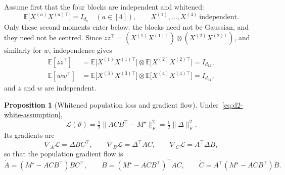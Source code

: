 \documentclass[11pt]{article}
\newcommand{\E}{\mathbb{E}}
\newcommand{\norm}[1]{\lVert #1\rVert}
\theoremstyle{definition}
\newtheorem{proposition}[theorem]{Proposition}
\numberwithin{equation}{section}
\begin{document}
Assume first that the four blocks are independent and whitened:
\begin{equation}\label{eq:d2-white-assumption}
\E\big[X^{(a)}X^{(a)\top}\big]=I_{d_a}\quad(a\in[4]),\qquad X^{(1)},\dots,X^{(4)}\ \text{independent}.
\end{equation}
Only these second moments enter below: the blocks need not be Gaussian, and they need not be centred. Since $zz^\top=(X^{(1)}X^{(1)\top})\otimes(X^{(2)}X^{(2)\top})$, and similarly for $w$, independence gives
\begin{align}
\E[zz^\top]&=\E\big[X^{(1)}X^{(1)\top}\big]\otimes\E\big[X^{(2)}X^{(2)\top}\big]=I_{d_{12}},\label{eq:d2-z-white}\\
\E[ww^\top]&=\E\big[X^{(3)}X^{(3)\top}\big]\otimes\E\big[X^{(4)}X^{(4)\top}\big]=I_{d_{34}},\label{eq:d2-w-white}
\end{align}
and $z$ and $w$ are independent.

\begin{proposition}[Whitened population loss and gradient flow]\label{prop:d2-white-flow}
Under~\eqref{eq:d2-white-assumption},
\begin{equation}\label{eq:d2-white-loss}
\mathcal L(\vartheta)=\tfrac12\norm{ACB^\top-M^\star}_F^2=\tfrac12\norm{\Delta}_F^2.
\end{equation}
Its gradients are
\begin{equation}\label{eq:d2-white-gradients}
\nabla_A\mathcal L=\Delta BC^\top,\qquad\nabla_B\mathcal L=\Delta^\top AC,\qquad\nabla_C\mathcal L=A^\top\Delta B,
\end{equation}
so that the population gradient flow is
\begin{equation}\label{eq:d2-white-flow}
\dot A=(M^\star-ACB^\top)BC^\top,\qquad\dot B=(M^\star-ACB^\top)^\top AC,\qquad\dot C=A^\top(M^\star-ACB^\top)B.
\end{equation}
\end{proposition}
\end{document}
